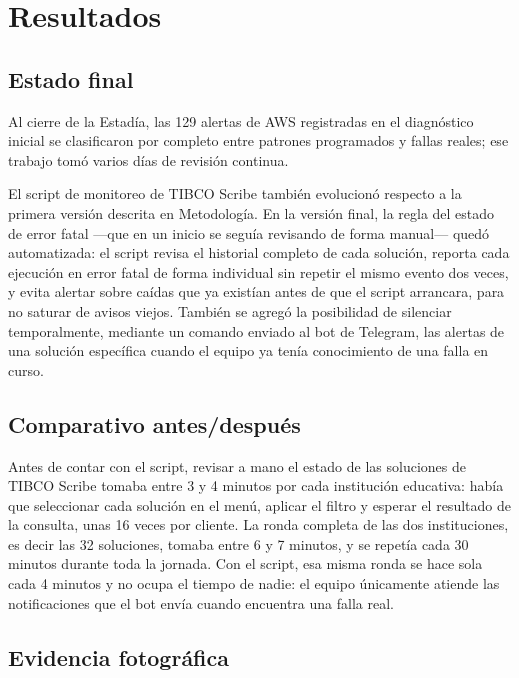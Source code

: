 \section{Resultados}
\label{ch:resultados}

\subsection{Estado final}
\label{sec:estado_final}

Al cierre de la Estadía, las 129 alertas de AWS registradas en el diagnóstico inicial se clasificaron por completo entre patrones programados y fallas reales; ese trabajo tomó varios días de revisión continua.

El script de monitoreo de TIBCO Scribe también evolucionó respecto a la primera versión descrita en Metodología. En la versión final, la regla del estado de error fatal —que en un inicio se seguía revisando de forma manual— quedó automatizada: el script revisa el historial completo de cada solución, reporta cada ejecución en error fatal de forma individual sin repetir el mismo evento dos veces, y evita alertar sobre caídas que ya existían antes de que el script arrancara, para no saturar de avisos viejos. También se agregó la posibilidad de silenciar temporalmente, mediante un comando enviado al bot de Telegram, las alertas de una solución específica cuando el equipo ya tenía conocimiento de una falla en curso.

\subsection{Comparativo antes/después}
\label{sec:comparativo}

Antes de contar con el script, revisar a mano el estado de las soluciones de TIBCO Scribe tomaba entre 3 y 4 minutos por cada institución educativa: había que seleccionar cada solución en el menú, aplicar el filtro y esperar el resultado de la consulta, unas 16 veces por cliente. La ronda completa de las dos instituciones, es decir las 32 soluciones, tomaba entre 6 y 7 minutos, y se repetía cada 30 minutos durante toda la jornada. Con el script, esa misma ronda se hace sola cada 4 minutos y no ocupa el tiempo de nadie: el equipo únicamente atiende las notificaciones que el bot envía cuando encuentra una falla real.

\subsection{Evidencia fotográfica}
\label{sec:evidencia_fotografica}

